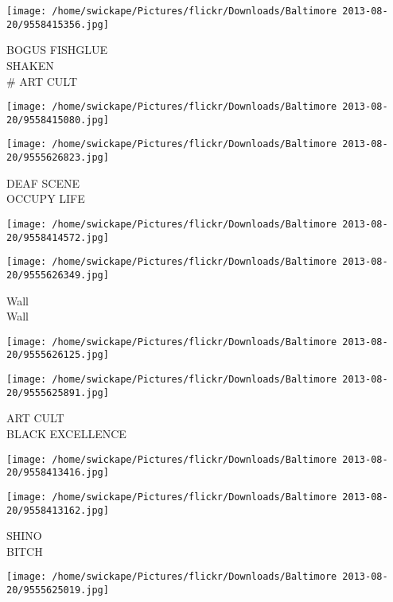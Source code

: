 \documentclass[10pt,letterpaper]{article}
\begin{document}
\vspace{0.25in}
\texttt{[image: /home/swickape/Pictures/flickr/Downloads/Baltimore 2013-08-20/9558415356.jpg]}

BOGUS FISHGLUE\\
SHAKEN\\
\# ART CULT\\
\pagebreak

\texttt{[image: /home/swickape/Pictures/flickr/Downloads/Baltimore 2013-08-20/9558415080.jpg]}

\vspace{0.25in}
\texttt{[image: /home/swickape/Pictures/flickr/Downloads/Baltimore 2013-08-20/9555626823.jpg]}

DEAF SCENE\\
OCCUPY LIFE\\
\pagebreak

\texttt{[image: /home/swickape/Pictures/flickr/Downloads/Baltimore 2013-08-20/9558414572.jpg]}

\vspace{0.25in}
\texttt{[image: /home/swickape/Pictures/flickr/Downloads/Baltimore 2013-08-20/9555626349.jpg]}

Wall\\
Wall\\
\pagebreak

\texttt{[image: /home/swickape/Pictures/flickr/Downloads/Baltimore 2013-08-20/9555626125.jpg]}

\vspace{0.25in}
\texttt{[image: /home/swickape/Pictures/flickr/Downloads/Baltimore 2013-08-20/9555625891.jpg]}

ART CULT\\
BLACK EXCELLENCE\\
\pagebreak

\texttt{[image: /home/swickape/Pictures/flickr/Downloads/Baltimore 2013-08-20/9558413416.jpg]}

\vspace{0.25in}
\texttt{[image: /home/swickape/Pictures/flickr/Downloads/Baltimore 2013-08-20/9558413162.jpg]}

SHINO\\
BITCH\\
\pagebreak

\texttt{[image: /home/swickape/Pictures/flickr/Downloads/Baltimore 2013-08-20/9555625019.jpg]}
\end{document}
